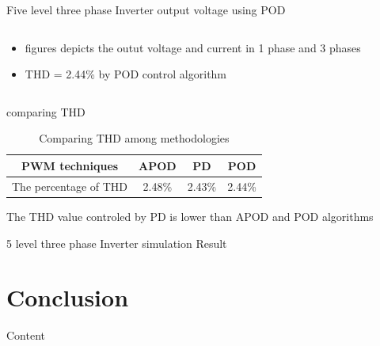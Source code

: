 \documentclass[
	11pt, %
]{beamer}
\begin{document}
\begin{frame}{Five level three phase Inverter output voltage using POD}
\begin{columns}
\begin{column}{0.5\textwidth}
\begin{figure}
		\end{figure}
		\begin{itemize}
			\scriptsize
			\item {figures depicts the outut voltage and current in 1 phase and 3 phases}
			\item {THD = 2.44\% by POD control algorithm}
		\end{itemize}
	\end{column}
  \end{columns}
\end{frame}

\begin{frame}{comparing THD}
	\begin{table}[htbp]
		\centering
		\caption{Comparing THD among methodologies}
		\label{tab:example}
		\begin{tabular}{|c|c|c|c|}
			\hline
			PWM techniques & APOD & PD & POD \\
			\hline
			The percentage of THD & 2.48\% & 2.43\% & 2.44\% \\
			\hline
		\end{tabular}
	\end{table}
	\scriptsize{The THD value controled by PD is lower than APOD and POD algorithms}
\end{frame}

\begin{frame}{5 level three phase Inverter simulation Result}
	
\end{frame}


\section{Conclusion}
\begin{frame}{Content}
	
\end{frame}








\end{document}
